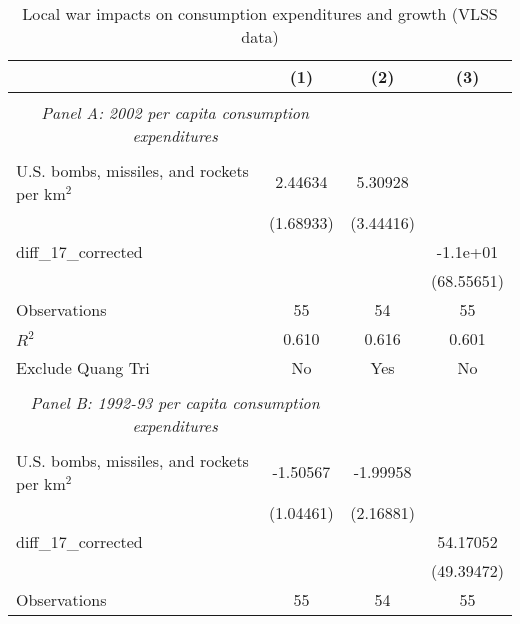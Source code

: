\begin{table}[htbp]\centering \\ \def\sym#1{\ifmmode^{#1}\else\(^{#1}\)\fi} \\ \caption{Local war impacts on consumption expenditures and growth (VLSS data)} \\ \begin{tabular}{l*{3}{c}} \hline\hline
                    &\multicolumn{1}{c}{(1)}         &\multicolumn{1}{c}{(2)}         &\multicolumn{1}{c}{(3)}         \\
\hline \\ \multicolumn{2}{c}{\emph{Panel A: 2002 per capita consumption expenditures}} \\\\[-1ex]
U.S. bombs, missiles, and rockets per km$^2$&     2.44634         &     5.30928         &                     \\
                    &   (1.68933)         &   (3.44416)         &                     \\
[1em]
diff\_17\_corrected   &                     &                     &    -1.1e+01         \\
                    &                     &                     &  (68.55651)         \\
\hline
Observations        &          55         &          54         &          55         \\
\(R^{2}\)           &       0.610         &       0.616         &       0.601         \\
Exclude Quang Tri   &          No         &         Yes         &          No         \\
\hline \\ \multicolumn{2}{c}{\emph{Panel B: 1992-93 per capita consumption expenditures}} \\\\[-1ex]
U.S. bombs, missiles, and rockets per km$^2$&    -1.50567         &    -1.99958         &                     \\
                    &   (1.04461)         &   (2.16881)         &                     \\
[1em]
diff\_17\_corrected   &                     &                     &    54.17052         \\
                    &                     &                     &  (49.39472)         \\
\hline
Observations        &          55         &          54         &          55         \\

\end{tabular}
\end{table}
